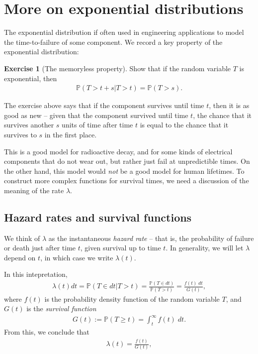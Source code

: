 \documentclass[11pt]{article}
\theoremstyle{definition}
\newtheorem{exercise}[]{Exercise}
\renewcommand{\P}{\mathbb{P}}
\begin{document}
\section{More on exponential distributions}
The exponential distribution if often used
in engineering applications to model the time-to-failure of some
component. We record a key property of the exponential distribution:
\begin{exercise}[The memoryless property]
Show that if the random variable $T$ is exponential, then
\begin{align*}
  \P(T > t + s | T > t) = \P(T > s).
\end{align*}

\end{exercise}

The exercise above says that if the component survives until time $t$,
then it is as good as new --
given that the component survived until time $t$,
the chance that it survives another $s$ units of time after time $t$ is equal to
the chance that it survives to $s$ in the first place.

This is a good model for radioactive decay, and for some kinds of electrical
components that do not wear out, but rather just fail at unpredictible times.
On the other hand, this model would \textit{not} be a good model for human lifetimes.
To construct more complex functions for survival times, we need
a discussion of the meaning of the rate $\lambda$.

\subsection{Hazard rates and survival functions}

We think of $\lambda$ as the instantaneous \textit{hazard rate} --
that is, the probability of failure or death just after time $t$, given survival up to
time $t$. In generality, we will let $\lambda$ depend on $t$,
in which case we write $\lambda(t)$.

In this intepretation,
\begin{align*}
\lambda(t) dt  = \P(T\in dt | T > t) = \frac{\P(T \in dt)}{\P(T > t)} =
\frac{f(t) \; dt}{G(t)},
\end{align*}
where $f(t)$ is the probability density function of the random variable $T$,
and $G(t)$ is the \textit{survival function}
\begin{align*}
G(t) := \P(T \geq t) = \int_{t}^\infty f(t)\; dt.
\end{align*}
From this, we conclude that
\begin{align}
  \lambda(t) = \frac{f(t)}{G(t)},
  \label{eq:hazard}
\end{align}
\end{document}
